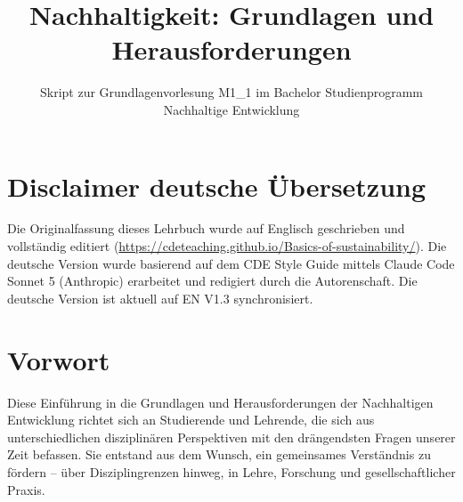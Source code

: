 \documentclass[
  nswissgerman,
  a4paper,
  openany]{book}
\title{Nachhaltigkeit: Grundlagen und Herausforderungen}
\subtitle{Skript zur Grundlagenvorlesung M1\_1 im Bachelor
Studienprogramm Nachhaltige Entwicklung}
\author{}
\date{}
\renewcommand*\contentsname{Inhaltsverzeichnis}
\newcommand\contentsname{Inhaltsverzeichnis}
\begin{document}
\frontmatter
\maketitle

\renewcommand*\contentsname{Inhaltsverzeichnis}
{
\setcounter{tocdepth}{2}
\tableofcontents
}

\mainmatter
{}

\chapter*{Disclaimer deutsche
Übersetzung}\label{disclaimer-deutsche-uxfcbersetzung}


\begin{tcolorbox}[enhanced jigsaw, arc=.35mm, bottomrule=.15mm, bottomtitle=1mm, breakable, colback=white, colbacktitle=quarto-callout-note-color!10!white, colframe=quarto-callout-note-color-frame, coltitle=black, left=2mm, leftrule=.75mm, opacityback=0, opacitybacktitle=0.6, rightrule=.15mm, title={Hinweis}, titlerule=0mm, toprule=.15mm, toptitle=1mm]

Die Originalfassung dieses Lehrbuch wurde auf Englisch geschrieben und
vollständig editiert
(\url{https://cdeteaching.github.io/Basics-of-sustainability/}). Die
deutsche Version wurde basierend auf dem CDE Style Guide mittels Claude
Code Sonnet 5 (Anthropic) erarbeitet und redigiert durch die
Autorenschaft. Die deutsche Version ist aktuell auf EN V1.3
synchronisiert.

\end{tcolorbox}


\chapter*{Vorwort}\label{vorwort}


Diese Einführung in die Grundlagen und Herausforderungen der
Nachhaltigen Entwicklung richtet sich an Studierende und Lehrende, die
sich aus unterschiedlichen disziplinären Perspektiven mit den
drängendsten Fragen unserer Zeit befassen. Sie entstand aus dem Wunsch,
ein gemeinsames Verständnis zu fördern -- über Disziplingrenzen hinweg,
in Lehre, Forschung und gesellschaftlicher Praxis.
\end{document}
